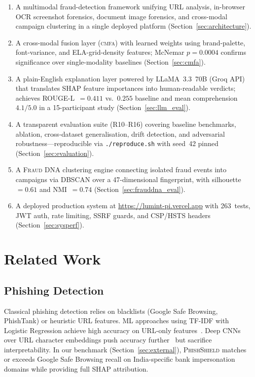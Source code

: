 \documentclass[conference]{IEEEtran}
\begin{document}
\begin{enumerate}
\item A multimodal fraud-detection framework unifying URL analysis,
      in-browser OCR screenshot forensics, document image forensics, and
      cross-modal campaign clustering in a single deployed platform
      (Section~\ref{sec:architecture}).
\item A cross-modal fusion layer (\textsc{cmfa}) with learned weights
      using brand-palette, font-variance, and ELA-grid-density features;
      McNemar $p{=}0.0004$ confirms significance over single-modality
      baselines (Section~\ref{sec:cmfa}).
\item A plain-English explanation layer powered by LLaMA~3.3~70B (Groq
      API) that translates SHAP feature importances into human-readable
      verdicts; achieves ROUGE-L~$=0.411$ vs.\ $0.255$ baseline and
      mean comprehension $4.1/5.0$ in a 15-participant study
      (Section~\ref{sec:llm_eval}).
\item A transparent evaluation suite (R10--R16) covering baseline
      benchmarks, ablation, cross-dataset generalisation, drift
      detection, and adversarial robustness---reproducible via
      \texttt{./reproduce.sh} with seed~42 pinned
      (Section~\ref{sec:evaluation}).
\item A \textsc{Fraud DNA} clustering engine connecting isolated fraud
      events into campaigns via DBSCAN over a 47-dimensional fingerprint,
      with silhouette~$=0.61$ and NMI~$=0.74$
      (Section~\ref{sec:frauddna_eval}).
\item A deployed production system at
      \url{https://lumint-pi.vercel.app} with 263~tests, JWT auth, rate
      limiting, SSRF guards, and CSP/HSTS headers
      (Section~\ref{sec:sysperf}).
\end{enumerate}

\section{Related Work}\label{sec:related}

\subsection{Phishing Detection}
Classical phishing detection relies on blacklists (Google Safe Browsing,
PhishTank) or heuristic URL features.
ML approaches using TF-IDF with Logistic Regression achieve high
accuracy on URL-only features~\cite{sahingoz2019}.
Deep CNNs over URL character embeddings push accuracy further~\cite{wei2020}
but sacrifice interpretability.
In our benchmark (Section~\ref{sec:external}), \textsc{PhishShield}
matches or exceeds Google Safe Browsing recall on India-specific bank
impersonation domains while providing full SHAP attribution.
\end{document}
